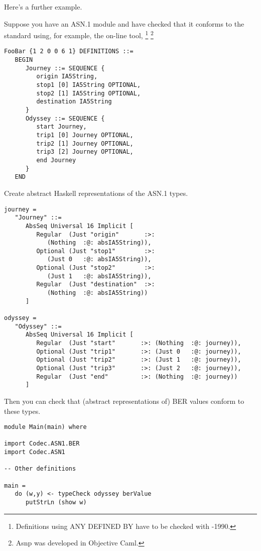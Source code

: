 \documentclass{article}
\begin{document}
Here's a further example.

Suppose you have an ASN.1 module and have checked that it conforms to
the standard using, for example, 
the on-line tool, 
\footnote{Definitions using ANY DEFINED BY have to be checked with -1990.}
\footnote{Asnp was developed in Objective Caml.}

\lstset{language=ASN1}
\begin{lstlisting}[frame=single]
FooBar {1 2 0 0 6 1} DEFINITIONS ::= 
   BEGIN 
      Journey ::= SEQUENCE {
         origin IA5String,
         stop1 [0] IA5String OPTIONAL,
         stop2 [1] IA5String OPTIONAL,
         destination IA5String
      }
      Odyssey ::= SEQUENCE {
         start Journey,
         trip1 [0] Journey OPTIONAL,
         trip2 [1] Journey OPTIONAL,
         trip3 [2] Journey OPTIONAL,
         end Journey
      }
   END 
\end{lstlisting}

Create abstract Haskell representations of the ASN.1 types.

\lstset{language=Haskell}
\begin{lstlisting}[frame=single]
journey =
   "Journey" ::=
      AbsSeq Universal 16 Implicit [
         Regular  (Just "origin"       :>: 
            (Nothing  :@: absIA5String)),
         Optional (Just "stop1"        :>: 
            (Just 0   :@: absIA5String)),
         Optional (Just "stop2"        :>: 
            (Just 1   :@: absIA5String)),
         Regular  (Just "destination"  :>: 
            (Nothing  :@: absIA5String))
      ]

odyssey =
   "Odyssey" ::=
      AbsSeq Universal 16 Implicit [
         Regular  (Just "start"       :>: (Nothing  :@: journey)),
         Optional (Just "trip1"       :>: (Just 0   :@: journey)),
         Optional (Just "trip2"       :>: (Just 1   :@: journey)),
         Optional (Just "trip3"       :>: (Just 2   :@: journey)),
         Regular  (Just "end"         :>: (Nothing  :@: journey))
      ]
\end{lstlisting}

Then you can check that (abstract representations of) BER values conform
to these types.

\begin{lstlisting}[frame=single]
module Main(main) where

import Codec.ASN1.BER
import Codec.ASN1

-- Other definitions

main = 
   do (w,y) <- typeCheck odyssey berValue
      putStrLn (show w)
\end{lstlisting}
\end{document}
